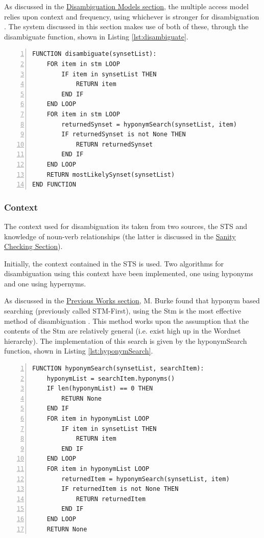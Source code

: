 \documentclass[]{article}
\begin{document}
As discussed in the \hyperref[sec:DisambiguationModels]{Disambiguation Models section}, the multiple access model relies upon context and frequency, using whichever is stronger for disambiguation \cite{PsychologyOfLanguage}. The system discussed in this section makes use of both of these, through the disambiguate function, shown in Listing \ref{lst:disambiguate}.

\begin{lstlisting}[numbers=left, numberstyle=\small, caption={The disambiguate function}, captionpos=b, label={lst:disambiguate}]
FUNCTION disambiguate(synsetList):
    FOR item in stm LOOP
        IF item in synsetList THEN
            RETURN item
        END IF
    END LOOP
    FOR item in stm LOOP
        returnedSynset = hyponymSearch(synsetList, item)
        IF returnedSynset is not None THEN
            RETURN returnedSynset
        END IF
    END LOOP
    RETURN mostLikelySynset(synsetList)
END FUNCTION
\end{lstlisting}

\subsubsection{Context}
\label{sec:DisambiguationContext}
The context used for disambiguation its taken from two sources, the STS and knowledge of noun-verb relationships (the latter is discussed in the \hyperref[sec:Sanity]{Sanity Checking Section}).

Initially, the context contained in the STS is used. Two algorithms for disambiguation using this context have been implemented, one using hyponyms and one using hypernyms.

As discussed in the \hyperref[sec:MattBurke]{Previous Works section}, M. Burke found that hyponym based searching (previously called STM-First), using the Stm is the most effective method of disambiguation \cite{MattBurkePrevious}. This method works upon the assumption that the contents of the Stm are relatively general (i.e. exist high up in the Wordnet hierarchy). The implementation of this search is given by the hyponymSearch function, shown in Listing \ref{lst:hyponymSearch}.

\begin{lstlisting}[numbers=left, numberstyle=\small, caption={The hyponymSearch function}, captionpos=b, label={lst:hyponymSearch}]
FUNCTION hyponymSearch(synsetList, searchItem):
    hyponymList = searchItem.hyponyms()
    IF len(hyponymList) == 0 THEN
        RETURN None
    END IF
    FOR item in hyponymList LOOP
        IF item in synsetList THEN
            RETURN item
        END IF
    END LOOP
    FOR item in hyponymList LOOP
        returnedItem = hyponymSearch(synsetList, item)
        IF returnedItem is not None THEN
            RETURN returnedItem
        END IF
    END LOOP
    RETURN None
\end{lstlisting}
\end{document}

